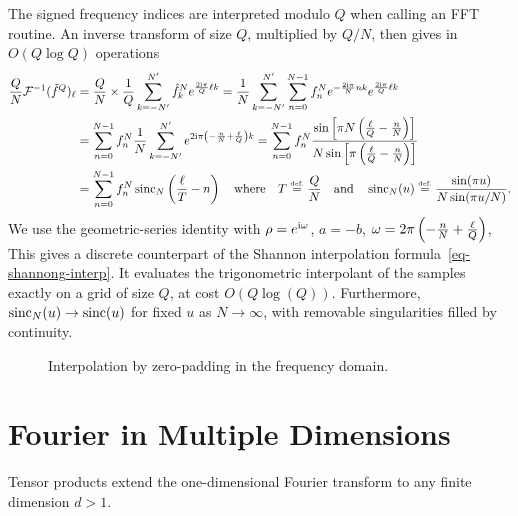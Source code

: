 The signed frequency indices are interpreted modulo $Q$ when calling an FFT routine.
An inverse transform of size $Q$, multiplied by $Q/N$, then gives in $O(Q\log Q)$ operations
\begin{align*}
	\frac{Q}{N} \mathcal{F}^{-1}( \tilde f^Q )_\ell &= 
	\frac{Q}{N} \times \frac{1}{Q} \sum_{k=-N'}^{N'} \hat f_k^N e^{ \frac{2\mathrm{i}\pi}{Q} \ell k }
	= \frac{1}{N} \sum_{k=-N'}^{N'} \sum_{n=0}^{N-1} f^N_n e^{-\frac{2\mathrm{i}\pi}{N} n k} e^{ \frac{2\mathrm{i}\pi}{Q} \ell k }  \\
	&= \sum_{n=0}^{N-1} f^N_n \frac{1}{N} \sum_{k=-N'}^{N'} e^{ 2\mathrm{i}\pi \left(  -\frac{n}{N} + \frac{\ell}{Q}  \right) k } 
	=  \sum_{n=0}^{N-1} f^N_n 
			\frac{ 
				\sin\left[ \pi N \left(  \frac{\ell}{Q} - \frac{n}{N}  \right) \right]  
			}{
				N \sin\left[ \pi \left(  \frac{\ell}{Q} - \frac{n}{N}  \right) \right]
			}  \\
	&= \sum_{n=0}^{N-1} f^N_n \operatorname{sinc}_N\left(  \frac{\ell}{T} - n  \right)
	\quad \text{where} \quad
	T \stackrel{\mbox{\upshape\tiny def.}}{=} \frac{Q}{N} \quad \text{and} \quad \operatorname{sinc}_N(u) \stackrel{\mbox{\upshape\tiny def.}}{=} \frac{ \sin(\pi u) }{ N \sin(\pi u /N) }.
\end{align*}
We use the geometric-series identity with $\rho=e^{\mathrm{i} \omega}$, $a=-b$, $\omega = 2\pi \left(  -\frac{n}{N} + \frac{\ell}{Q}  \right)$,
This gives a discrete counterpart of the Shannon interpolation formula~\eqref{eq-shannong-interp}. It evaluates the trigonometric interpolant of the samples exactly on a grid of size $Q$, at cost $O(Q\log(Q))$. Furthermore, $\operatorname{sinc}_N(u)\to\operatorname{sinc}(u)$ for fixed $u$ as $N\to\infty$, with removable singularities filled by continuity.

\begin{figure}[tbp]
\centering
{}
\caption{Interpolation by zero-padding in the frequency domain.}
\label{fig-padding-fourier}
\end{figure}

\section{Fourier in Multiple Dimensions}
\label{sec-fourier-multiple-dim}

Tensor products extend the one-dimensional Fourier transform to any finite dimension $d>1$.


